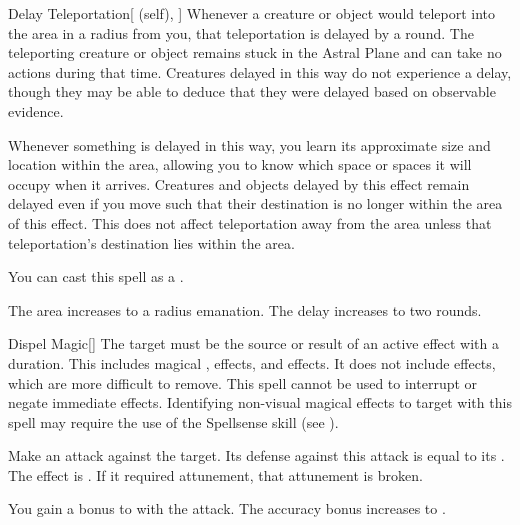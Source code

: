 \lowercase{\hypertarget{spell:Delay Teleportation}{}}\label{spell:Delay Teleportation}
\begin{attuneability}[Rank 4]{\hypertarget{spell:Delay Teleportation}{Delay Teleportation}}[ (self), ]
Whenever a creature or object would teleport into the area in a \arealarge radius  from you, that teleportation is delayed by a round.
The teleporting creature or object remains stuck in the Astral Plane and can take no actions during that time.
Creatures delayed in this way do not experience a delay, though they may be able to deduce that they were delayed based on observable evidence.

Whenever something is delayed in this way, you learn its approximate size and location within the area, allowing you to know which space or spaces it will occupy when it arrives.
Creatures and objects delayed by this effect remain delayed even if you move such that their destination is no longer within the area of this effect.
This does not affect teleportation away from the area unless that teleportation's destination lies within the area.

You can cast this spell as a .

\rankline
{} The area increases to a \areahuge radius emanation.
 The delay increases to two rounds.

\end{attuneability}
\vspace{0.25em}



\lowercase{\hypertarget{spell:Dispel Magic}{}}\label{spell:Dispel Magic}
\begin{freeability}[Rank 4]{\hypertarget{spell:Dispel Magic}{Dispel Magic}}[]
The target must be the source or result of an active  effect with a duration.
This includes magical ,  effects, and  effects.
It does not include  effects, which are more difficult to remove.
This spell cannot be used to interrupt or negate immediate effects.
Identifying non-visual magical effects to target with this spell may require the use of the Spellsense skill (see ).

Make an attack against the target.
Its defense against this attack is equal to its .
\hit The effect is .
If it required attunement, that attunement is broken.

\rankline
{} You gain a  bonus to  with the attack.
 The accuracy bonus increases to .

\end{freeability}
\vspace{0.25em}



